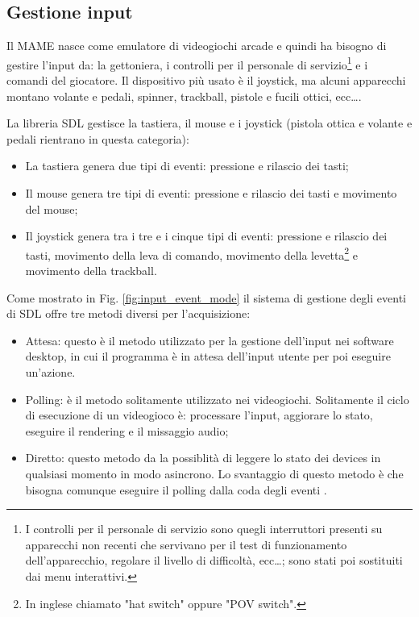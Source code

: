 \subsection{Gestione input}
Il MAME nasce come emulatore di videogiochi arcade e quindi ha bisogno di gestire l'input da: la gettoniera, i controlli per il personale di servizio\footnote{I controlli per il personale di servizio sono quegli interruttori presenti su apparecchi non recenti che servivano per il test di funzionamento dell'apparecchio, regolare il livello di difficoltà, ecc\dots; sono stati poi sostituiti dai menu interattivi.} e i comandi del giocatore. Il dispositivo più usato è il joystick, ma alcuni apparecchi montano volante e pedali, spinner, trackball, pistole e fucili ottici, ecc\dots \parencite{Il_progetto_MAME}.

La libreria SDL gestisce la tastiera, il mouse e i joystick (pistola ottica e volante e pedali rientrano in questa categoria):

\begin{itemize}	
	\item La tastiera genera due tipi di eventi: pressione e rilascio dei tasti;
	\item Il mouse genera tre tipi di eventi: pressione e rilascio dei tasti e movimento del mouse;
	\item Il joystick genera tra i tre e i cinque tipi di eventi: pressione e rilascio dei tasti, movimento della leva di comando, movimento della levetta\footnote{In inglese chiamato "hat switch" oppure "POV switch".} e movimento della trackball.
\end{itemize}

Come mostrato in Fig. \ref{fig:input_event_mode} il sistema di gestione degli eventi di SDL offre tre metodi diversi per l'acquisizione:

\begin{itemize}	
	\item Attesa: questo è il metodo utilizzato per la gestione dell'input nei software desktop, in cui il programma è in attesa dell'input utente per poi eseguire un'azione.
	\item Polling: è il metodo solitamente utilizzato nei videogiochi. Solitamente il ciclo di esecuzione di un videogioco è: processare l'input, aggiorare lo stato, eseguire il rendering e il missaggio audio;
	\item Diretto: questo metodo da la possiblità di leggere lo stato dei devices in qualsiasi momento in modo asincrono. Lo svantaggio di questo metodo è che bisogna comunque eseguire il polling dalla coda degli eventi \parencite{FocusOnSDL}.
\end{itemize}

